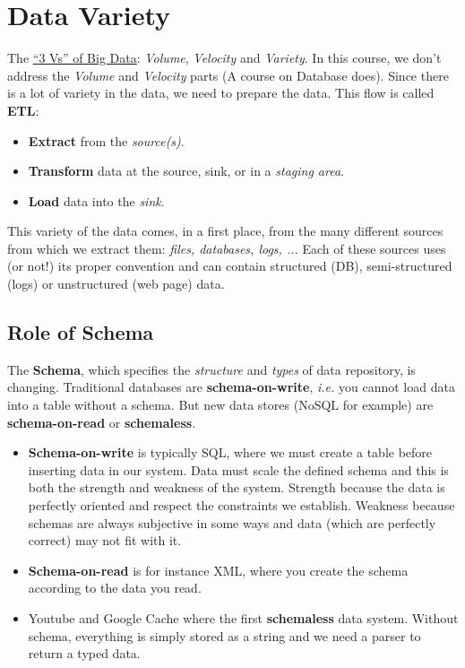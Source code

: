 
\section{Data Variety}

The \href{http://blog.sqlauthority.com/2013/10/02/big-data-what-is-big-data-3-vs-of-big-data-volume-velocity-and-variety-day-2-of-21/}{``3 Vs'' of Big Data}: {\it Volume}, {\it Velocity} and {\it Variety}. In this course, we don't address the {\it Volume} and {\it Velocity} parts (A course on Database does). Since there is a lot of variety in the data, we need to prepare the data. This flow is called {\bf ETL}:
\begin{itemize}
 \item {\bf Extract} from the {\it source(s)}.
 \item {\bf Transform} data at the source, sink, or in a {\it staging area}.
 \item {\bf Load} data into the {\it sink}.  
\end{itemize}
This variety of the data comes, in a first place, from the many different sources from which we extract them: {\it files, databases, logs, ... } Each of these sources uses (or not!) its proper convention and can contain structured (DB), semi-structured (logs) or unstructured (web page) data. 

\subsection{Role of Schema}
The {\bf Schema}, which specifies the {\it structure} and {\it types} of data repository, is changing. Traditional databases are {\bf schema-on-write}, {\it i.e.} you cannot load data into a table without a schema. But new data stores (NoSQL for example) are {\bf schema-on-read} or {\bf schemaless}. 

\begin{itemize}
	\item {\bf Schema-on-write} is typically SQL, where we must create a table before inserting data in our system. Data must scale the defined schema and this is both the strength and weakness of the system. Strength because the data is perfectly oriented and respect the constraints we establish. Weakness because schemas are always subjective in some ways and data (which are perfectly correct) may not fit with it. 
	\item {\bf Schema-on-read} is for instance XML, where you create the schema according to the data you read.
	\item Youtube and Google Cache where the first {\bf schemaless} data system. Without schema, everything is simply stored as a string and we need a parser to return a typed data.
\end{itemize}

